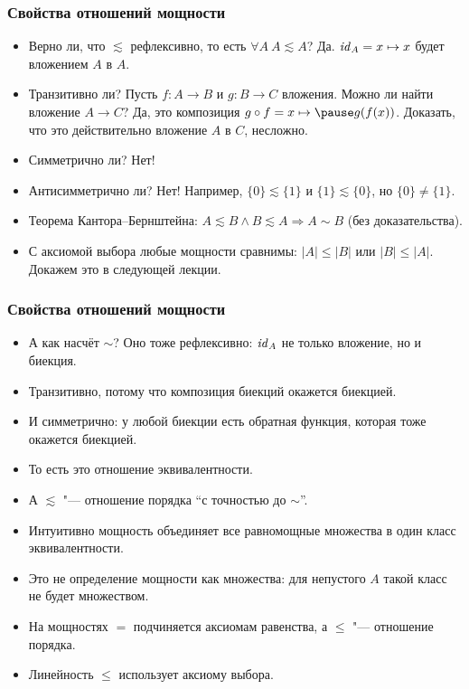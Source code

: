 \documentclass[10pt]{beamer}
\begin{document}
\begin{frame}
    \frametitle{Свойства отношений мощности}
    \begin{itemize}
        \item Верно ли, что $\lesssim$ рефлексивно, то есть \pause $\forall A~A \lesssim A$? \pause Да. $\mathit{id}_A = x \mapsto x$ будет вложением $A$ в $A$.
        \item Транзитивно ли? Пусть $f: A \to B$ и $g: B \to C$ вложения. Можно ли найти вложение $A \to C$? \pause Да, это композиция $g \circ f = x \mapsto \pause g(f(x))$. Доказать, что это действительно вложение $A$ в $C$, несложно.
        \item Симметрично ли? \pause Нет!
        \item Антисимметрично ли? \pause Нет! Например, $\{0\}\lesssim\{1\}$ и $\{1\}\lesssim\{0\}$, но $\{0\}\neq\{1\}$.
        \item Теорема Кантора--Бернштейна: $A \lesssim B \land B \lesssim A \Rightarrow A \sim B$ (без доказательства).
        \item С аксиомой выбора любые мощности сравнимы: $|A|\leq|B|$ или $|B|\leq|A|$. Докажем это в следующей лекции.
    \end{itemize}
\end{frame}

\begin{frame}
    \frametitle{Свойства отношений мощности}
    \begin{itemize}
        \item А как насчёт $\sim$? Оно тоже рефлексивно: $\mathit{id}_A$ не только вложение, но и \pause биекция.
        \pause
        \item Транзитивно, потому что \pause композиция биекций окажется биекцией.
        \pause
        \item И симметрично: у любой биекции есть \pause обратная функция, которая тоже окажется биекцией.
        \pause
        \item То есть это отношение \pause эквивалентности.
        \item А $\lesssim$ "--- отношение порядка \enquote{с точностью до $\sim$}.
        \pause
        \item Интуитивно мощность объединяет все равномощные множества в один класс эквивалентности.
        \item Это не определение мощности как множества: для непустого $A$ такой класс не будет множеством.
        \item На мощностях $=$ подчиняется аксиомам равенства, а $\leq$ "--- отношение порядка.
        \item Линейность $\leq$ использует аксиому выбора.
    \end{itemize}
\end{frame}
\end{document}

